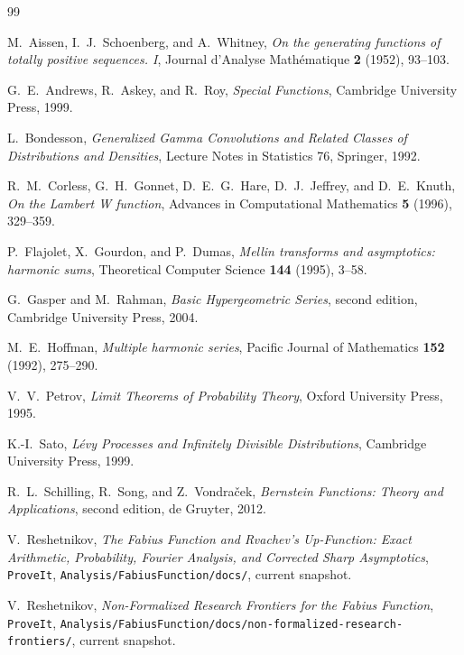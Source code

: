 \documentclass[11pt,oneside]{article}
\theoremstyle{definition}
\theoremstyle{remark}
\begin{document}
\begin{thebibliography}{99}

M.~Aissen, I.~J.~Schoenberg, and A.~Whitney,
\emph{On the generating functions of totally positive sequences. I},
Journal d'Analyse Math\'ematique \textbf{2} (1952), 93--103.

G.~E.~Andrews, R.~Askey, and R.~Roy,
\emph{Special Functions}, Cambridge University Press, 1999.

L.~Bondesson,
\emph{Generalized Gamma Convolutions and Related Classes of Distributions and
Densities}, Lecture Notes in Statistics 76, Springer, 1992.

R.~M.~Corless, G.~H.~Gonnet, D.~E.~G.~Hare, D.~J.~Jeffrey, and D.~E.~Knuth,
\emph{On the Lambert W function}, Advances in Computational Mathematics
\textbf{5} (1996), 329--359.

P.~Flajolet, X.~Gourdon, and P.~Dumas,
\emph{Mellin transforms and asymptotics: harmonic sums},
Theoretical Computer Science \textbf{144} (1995), 3--58.

G.~Gasper and M.~Rahman,
\emph{Basic Hypergeometric Series}, second edition, Cambridge University Press,
2004.

M.~E.~Hoffman,
\emph{Multiple harmonic series}, Pacific Journal of Mathematics
\textbf{152} (1992), 275--290.

V.~V.~Petrov,
\emph{Limit Theorems of Probability Theory}, Oxford University Press, 1995.

K.-I.~Sato,
\emph{L\'evy Processes and Infinitely Divisible Distributions},
Cambridge University Press, 1999.

R.~L.~Schilling, R.~Song, and Z.~Vondra\v{c}ek,
\emph{Bernstein Functions: Theory and Applications}, second edition,
de Gruyter, 2012.

V.~Reshetnikov,
\emph{The Fabius Function and Rvachev's Up-Function: Exact Arithmetic,
Probability, Fourier Analysis, and Corrected Sharp Asymptotics},
\texttt{ProveIt}, \nolinkurl{Analysis/FabiusFunction/docs/}, current snapshot.

V.~Reshetnikov,
\emph{Non-Formalized Research Frontiers for the Fabius Function},
\texttt{ProveIt}, \nolinkurl{Analysis/FabiusFunction/docs/non-formalized-research-frontiers/},
current snapshot.

\end{thebibliography}
\end{document}
